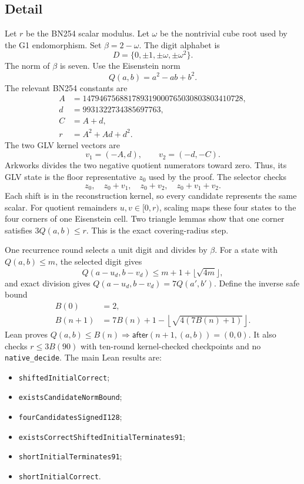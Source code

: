 \documentclass[10pt]{article}
\begin{document}
\subsection{Detail}
Let $r$ be the BN254 scalar modulus.
Let $\omega$ be the nontrivial cube root used by the G1 endomorphism.
Set $\beta=2-\omega$.
The digit alphabet is
\[
  D=\{0,\pm1,\pm\omega,\pm\omega^2\}.
\]
The norm of $\beta$ is seven.
Use the Eisenstein norm
\[
  Q(a,b)=a^2-ab+b^2.
\]
The relevant BN254 constants are
\begin{align*}
 A &=147946756881789319000765030803803410728,\\
 d &=9931322734385697763,\\
 C &=A+d,\\
 r &=A^2+Ad+d^2.
\end{align*}
The two GLV kernel vectors are
\[
  v_1=(-A,d),\qquad v_2=(-d,-C).
\]
Arkworks divides the two negative quotient numerators toward zero.
Thus, its GLV state is the floor representative $z_0$ used by the proof.
The selector checks
\[
  z_0,\quad z_0+v_1,\quad z_0+v_2,\quad z_0+v_1+v_2.
\]
Each shift is in the reconstruction kernel, so every candidate represents the same scalar.
For quotient remainders $u,v\in[0,r)$, scaling maps these four states to the four corners of one Eisenstein cell.
Two triangle lemmas show that one corner satisfies $3Q(a,b)\le r$.
This is the exact covering-radius step.

One recurrence round selects a unit digit and divides by $\beta$.
For a state with $Q(a,b)\le m$, the selected digit gives
\[
  Q(a-u_d,b-v_d)\le m+1+\lfloor\sqrt{4m}\rfloor,
\]
and exact division gives $Q(a-u_d,b-v_d)=7Q(a',b')$.
Define the inverse safe bound
\begin{align*}
 B(0)&=2,\\
 B(n+1)&=7B(n)+1-\left\lfloor\sqrt{4(7B(n)+1)}\right\rfloor.
\end{align*}
Lean proves $Q(a,b)\le B(n)\Longrightarrow \mathsf{after}(n+1,(a,b))=(0,0)$.
It also checks $r\le3B(90)$ with ten-round kernel-checked checkpoints and no \texttt{native\_decide}.
The main Lean results are:
\begin{itemize}
  \item \texttt{shiftedInitialCorrect};
  \item \texttt{existsCandidateNormBound};
  \item \texttt{fourCandidatesSignedI128};
  \item \texttt{existsCorrectShiftedInitialTerminates91};
  \item \texttt{shortInitialTerminates91};
  \item \texttt{shortInitialCorrect}.
\end{itemize}
\end{document}
